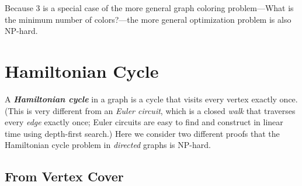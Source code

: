 Because 3 is a special case of the more general graph coloring problem---What is the minimum number of colors?---the more general optimization problem is also NP-hard.

\section{Hamiltonian Cycle}
\label{sec:12.11}

A \textbf{\textit{Hamiltonian cycle}} in a graph is a cycle that visits every vertex exactly once.
(This is very different from an \textit{Euler circuit}, which is a closed \textit{walk} that traverses every \textit{edge} exactly once; Euler circuits are easy to find and construct in linear time using depth-first search.)
Here we consider two different proofs that the Hamiltonian cycle problem in \textit{directed} graphs is NP-hard.

\subsection{From Vertex Cover}

